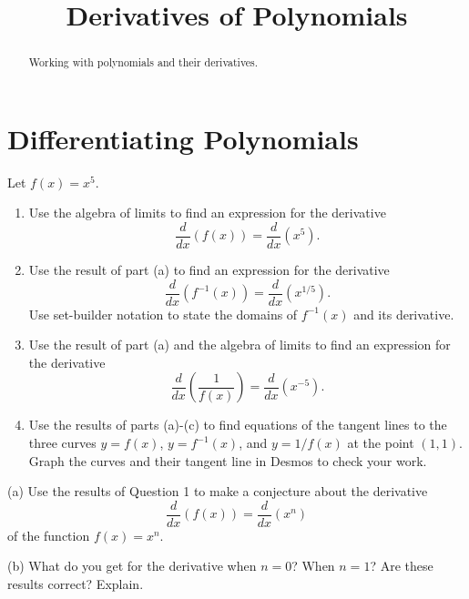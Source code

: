 \documentclass{ximera}
\title{Derivatives of Polynomials}
\begin{document}
\begin{abstract}
Working with polynomials and their derivatives.
\end{abstract}
\maketitle

\section{Differentiating Polynomials}

\begin{question}  \label{Qdst4hbbh}

Let $f(x)=x^5$. 

\begin{enumerate}
\item Use the algebra of limits to find an expression for the derivative 
\[
     \frac{d}{dx}(f(x)) =   \frac{d}{dx}\left( x^5 \right) .
\]

\item Use the result of part (a) to find an expression for the derivative
\[
    \frac{d}{dx}(f^{-1}(x)) =   \frac{d}{dx}\left( x^{1/5} \right) .
\]
Use set-builder notation to state the domains of $f^{-1}(x)$ and its derivative. 

\item Use the result of part (a) and the algebra of limits to find an expression for the derivative
\[
    \frac{d}{dx} \left( \frac{1}{f(x)} \right) =   \frac{d}{dx}\left( x^{-5} \right) .
\]

\item Use the results of parts (a)-(c) to find equations of the tangent lines to the three curves $y=f(x)$, $y=f^{-1}(x)$, and $y=1/f(x)$ at the point $(1,1)$. Graph the curves and their tangent line in Desmos to check your work.

\end{enumerate}

\end{question}


\begin{question}  \label{Qdsferewg}
(a) Use the results of Question 1 to make a conjecture about the derivative
\[
     \frac{d}{dx}(f(x)) =   \frac{d}{dx}\left( x^n \right)
\]
of the function $f(x)=x^n$.

(b) What do you get for the derivative when $n=0$? When $n=1$? Are these results correct? Explain.

\end{question}
\end{document}
